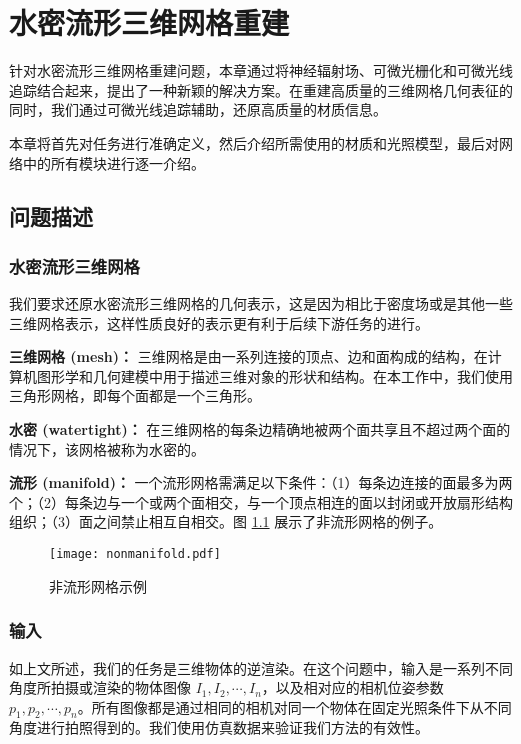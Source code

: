 \chapter{水密流形三维网格重建}

针对水密流形三维网格重建问题，本章通过将神经辐射场、可微光栅化和可微光线追踪结合起来，提出了一种新颖的解决方案。在重建高质量的三维网格几何表征的同时，我们通过可微光线追踪辅助，还原高质量的材质信息。

本章将首先对任务进行准确定义，然后介绍所需使用的材质和光照模型，最后对网络中的所有模块进行逐一介绍。

\section{问题描述}

\subsection{水密流形三维网格}

我们要求还原水密流形三维网格的几何表示，这是因为相比于密度场或是其他一些三维网格表示，这样性质良好的表示更有利于后续下游任务的进行。

\textbf{三维网格 (mesh)：} 三维网格是由一系列连接的顶点、边和面构成的结构，在计算机图形学和几何建模中用于描述三维对象的形状和结构。在本工作中，我们使用三角形网格，即每个面都是一个三角形。

\textbf{水密 (watertight)：} 在三维网格的每条边精确地被两个面共享且不超过两个面的情况下，该网格被称为水密的。

\textbf{流形 (manifold)：} 一个流形网格需满足以下条件：（1）每条边连接的面最多为两个；（2）每条边与一个或两个面相交，与一个顶点相连的面以封闭或开放扇形结构组织；（3）面之间禁止相互自相交。图 \ref{fig:nonmanifold} 展示了非流形网格的例子。

\begin{figure}
  \centering
  \texttt{[image: nonmanifold.pdf]}
  \caption{非流形网格示例}
  \label{fig:nonmanifold}
\end{figure}

\subsection{输入}

如上文所述，我们的任务是三维物体的逆渲染。在这个问题中，输入是一系列不同角度所拍摄或渲染的物体图像 $I_1, I_2, \cdots, I_n$，以及相对应的相机位姿参数 $p_1, p_2, \cdots, p_n$。所有图像都是通过相同的相机对同一个物体在固定光照条件下从不同角度进行拍照得到的。我们使用仿真数据来验证我们方法的有效性。

